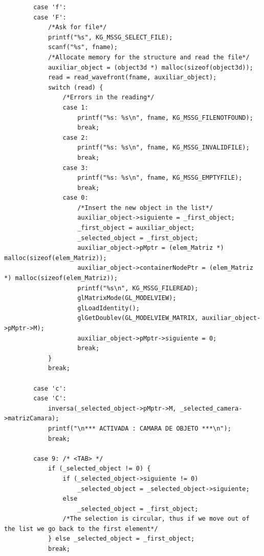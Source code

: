 \documentclass[12pt,a4paper]{article}
\begin{document}
\begin{lstlisting}
        case 'f':
        case 'F':
            /*Ask for file*/
            printf("%s", KG_MSSG_SELECT_FILE);
            scanf("%s", fname);
            /*Allocate memory for the structure and read the file*/
            auxiliar_object = (object3d *) malloc(sizeof(object3d));
            read = read_wavefront(fname, auxiliar_object);
            switch (read) {
                /*Errors in the reading*/
                case 1:
                    printf("%s: %s\n", fname, KG_MSSG_FILENOTFOUND);
                    break;
                case 2:
                    printf("%s: %s\n", fname, KG_MSSG_INVALIDFILE);
                    break;
                case 3:
                    printf("%s: %s\n", fname, KG_MSSG_EMPTYFILE);
                    break;
                case 0:
                    /*Insert the new object in the list*/
                    auxiliar_object->siguiente = _first_object;
                    _first_object = auxiliar_object;
                    _selected_object = _first_object;
                    auxiliar_object->pMptr = (elem_Matriz *) malloc(sizeof(elem_Matriz));
                    auxiliar_object->containerNodePtr = (elem_Matriz *) malloc(sizeof(elem_Matriz));
                    printf("%s\n", KG_MSSG_FILEREAD);
                    glMatrixMode(GL_MODELVIEW);
                    glLoadIdentity();
                    glGetDoublev(GL_MODELVIEW_MATRIX, auxiliar_object->pMptr->M);
                    auxiliar_object->pMptr->siguiente = 0;
                    break;
            }
            break;
            
        case 'c':
        case 'C':
            inversa(_selected_object->pMptr->M, _selected_camera->matrizCamara);
            printf("\n*** ACTIVADA : CAMARA DE OBJETO ***\n");
            break;
            
        case 9: /* <TAB> */
            if (_selected_object != 0) {
                if (_selected_object->siguiente != 0)
                    _selected_object = _selected_object->siguiente;
                else
                    _selected_object = _first_object;
                /*The selection is circular, thus if we move out of the list we go back to the first element*/
            } else _selected_object = _first_object;
            break;
            

\end{lstlisting}
\end{document}
